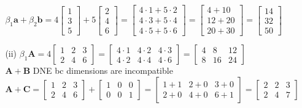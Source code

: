 \documentclass[11pt,letterpaper]{article}
\begin{document}
\begin{enumerate}
\begin{enumerate}
\begin{enumerate}
            $\beta_1 \mathbf{a} + \beta_2 \mathbf{b} = 4 \begin{bmatrix} 1 \\ 3 \\ 5 \end{bmatrix} + 5 \begin{bmatrix} 2 \\ 4 \\ 6 \end{bmatrix} = \begin{bmatrix} 4 \cdot 1 + 5 \cdot 2 \\ 4 \cdot 3 + 5 \cdot 4 \\ 4 \cdot 5 + 5 \cdot 6 \end{bmatrix} = \begin{bmatrix} 4 + 10 \\ 12 + 20 \\ 20 + 30 \end{bmatrix} = \begin{bmatrix} 14 \\ 32 \\ 50 \end{bmatrix}$
\item [(ii)] $\beta_1 \mathbf{A} = 4 \begin{bmatrix} 1 & 2 & 3 \\ 2 & 4 & 6 \end{bmatrix} = \begin{bmatrix} 4 \cdot 1 & 4 \cdot 2 & 4 \cdot 3 \\ 4 \cdot 2 & 4 \cdot 4 & 4 \cdot 6 \end{bmatrix} = \begin{bmatrix} 4 & 8 & 12 \\ 8 & 16 & 24 \end{bmatrix}$\\
             $\mathbf{A} + \mathbf{B}$ DNE bc dimensions are incompatible \\
             $\mathbf{A} + \mathbf{C} = \begin{bmatrix} 1 & 2 & 3 \\ 2 & 4 & 6 \end{bmatrix} + \begin{bmatrix} 1 & 0 & 0 \\ 0 & 0 & 1 \end{bmatrix} = \begin{bmatrix} 1 + 1 & 2 + 0 & 3 + 0 \\ 2 + 0 & 4 + 0 & 6 + 1 \end{bmatrix} = \begin{bmatrix} 2 & 2 & 3 \\ 2 & 4 & 7 \end{bmatrix}$

\end{enumerate}
\end{enumerate}
\end{enumerate}
\end{document}
